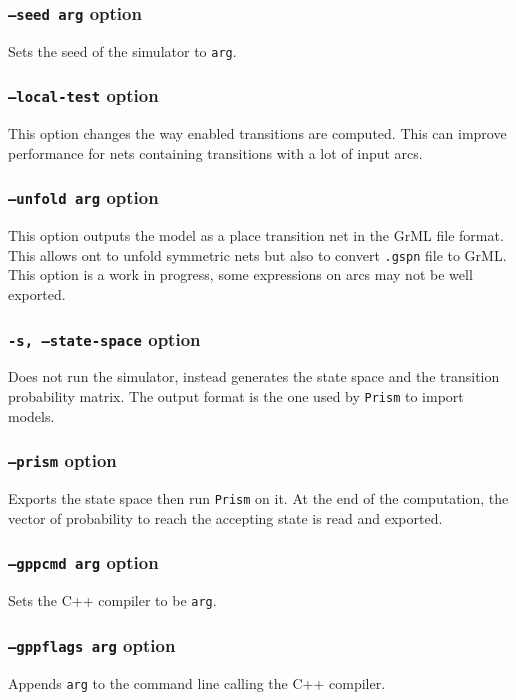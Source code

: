 \documentclass{article}
\begin{document}
\subsubsection{\texttt{--seed arg} option}
Sets the seed of the simulator to \texttt{arg}. 

\subsubsection{\texttt{--local-test} option}
This option changes the way enabled transitions are computed.  This can
improve performance for nets containing transitions with a lot of input
arcs.


\subsubsection{\texttt{--unfold arg} option}
This option outputs the model as a place transition net in the GrML
file format. This allows ont to unfold symmetric nets but also to convert
\texttt{.gspn} file to GrML. This option is a work in progress, some
expressions on arcs may not be well exported.


\subsubsection{\texttt{-s, --state-space} option}
Does not run the simulator, instead generates the state space and 
the transition probability matrix. The output format is the one
used by \texttt{Prism} to import models. 

\subsubsection{\texttt{--prism} option}
Exports the state space then run \texttt{Prism} on it.
At the end of the computation, the vector of probability to reach the
accepting state is read and exported.

\subsubsection{\texttt{--gppcmd arg} option}
Sets the C++ compiler to be \texttt{arg}.

\subsubsection{\texttt{--gppflags arg} option}
Appends \texttt{arg} to the command line calling the C++ compiler.
\end{document}
